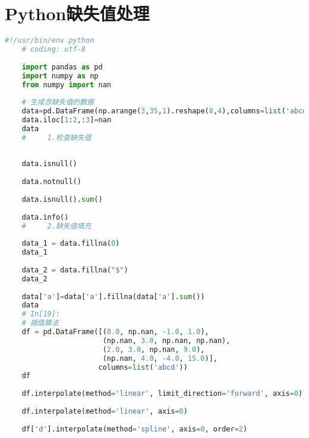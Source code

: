\documentclass{article}
\begin{document}
\section{Python缺失值处理}
\begin{lstlisting}[language=Python]
    #!/usr/bin/env python
    # coding: utf-8
    
    import pandas as pd
    import numpy as np
    from numpy import nan
    
    # 生成含缺失值的数据
    data=pd.DataFrame(np.arange(3,35,1).reshape(8,4),columns=list('abcd'))
    data.iloc[1:2,:3]=nan
    data
    #     1.检查缺失值
    
    
    data.isnull()
    
    data.notnull()
    
    data.isnull().sum()
    
    data.info()
    #     2.缺失值填充
    
    data_1 = data.fillna(0)
    data_1
    
    data_2 = data.fillna("$")
    data_2
    
    data['a']=data['a'].fillna(data['a'].sum())
    data
    # In[19]:
    # 插值算法
    df = pd.DataFrame([(0.0, np.nan, -1.0, 1.0),
                       (np.nan, 3.0, np.nan, np.nan),
                       (2.0, 3.0, np.nan, 9.0),
                       (np.nan, 4.0, -4.0, 15.0)],
                      columns=list('abcd'))
    df
    
    df.interpolate(method='linear', limit_direction='forward', axis=0)
    
    df.interpolate(method='linear', axis=0)
    
    df['d'].interpolate(method='spline', axis=0, order=2)
    



\end{lstlisting} 
\end{document}
